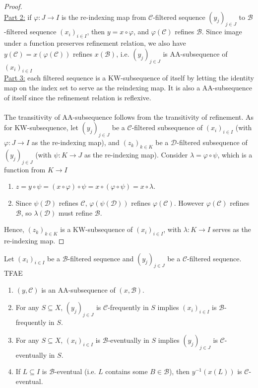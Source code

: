 \documentclass{treatise}
\begin{document}
\begin{proof}
\ \\
\underline{Part 2:} if $\varphi: J \to I$ is the re-indexing map from $\mathcal{C}$-filtered sequence $(y_j)_{j \in J}$ to $\mathcal{B}$-filtered sequence $(x_i)_{i \in I}$, then $y = x \circ \varphi$, and $\varphi(\mathcal{C})$ refines $\mathcal{B}$. Since image under a function preserves refinement relation, we also have $y(\mathcal{C}) = x(\varphi(\mathcal{C}))$ refines $x(\mathcal{B})$, i.e. $(y_j)_{j \in J}$ is AA-subsequence of $(x_i)_{i \in I}$
\\
\underline{Part 3:} each filtered sequence is a KW-subsequence of itself by letting the identity map on the index set to serve as the reindexing map. It is also a AA-subsequence of itself since the refinement relation is reflexive.
\\
\\
The transitivity of AA-subsequence follows from the transitivity of refinement. As for KW-subsequence, let $(y_j)_{j \in J}$ be a $\mathcal{C}$-filtered subsequence of $(x_i)_{i \in I}$ (with $\varphi: J \to I$ as the re-indexing map), and $(z_k)_{k \in K}$ be a $\mathcal{D}$-filtered subsequence of $(y_j)_{j \in J}$ (with $\psi: K \to J$ as the re-indexing map). Consider $\lambda = \varphi \circ \psi$, which is a function from $K \to I$
\begin{enumerate}
    \item $z = y \circ \psi = (x \circ \varphi) \circ \psi = x \circ (\varphi \circ \psi) = x \circ \lambda$.
    \item Since $\psi(\mathcal{D})$ refines $\mathcal{C}$, $\varphi(\psi(\mathcal{D}))$ refines $\varphi(\mathcal{C})$. However $\varphi(\mathcal{C})$ refines $\mathcal{B}$, so $\lambda(\mathcal{D})$ must refine $\mathcal{B}$. 
\end{enumerate}
Hence, $(z_k)_{k \in K}$ is a KW-subsequence of $(x_i)_{i \in I}$, with $\lambda: K \to I$ serves as the re-indexing map.
\end{proof}
\begin{proposition}
Let $(x_i)_{i \in I}$ be a $\mathcal{B}$-filtered sequence and $(y_j)_{j \in J}$ be a $\mathcal{C}$-filtered sequence. TFAE
\begin{enumerate}
    \item $(y, \mathcal{C})$ is an AA-subsequence of $(x, \mathcal{B})$.
    \item For any $S \subseteq X$, $(y_j)_{j \in J}$ is $\mathcal{C}$-frequently in $S$ implies $(x_i)_{i \in I}$ is $\mathcal{B}$-frequently in $S$.
    \item For any $S \subseteq X$, $(x_i)_{i \in I}$ is $\mathcal{B}$-eventually in $S$ implies $(y_j)_{j \in J}$ is $\mathcal{C}$-eventually in $S$.
    \item If $L \subseteq I$ is $\mathcal{B}$-eventual (i.e. $L$ contains some $B \in \mathcal{B}$), then $y^{-1}(x(L))$ is $\mathcal{C}$-eventual.
\end{enumerate}
\end{proposition}
\end{document}
